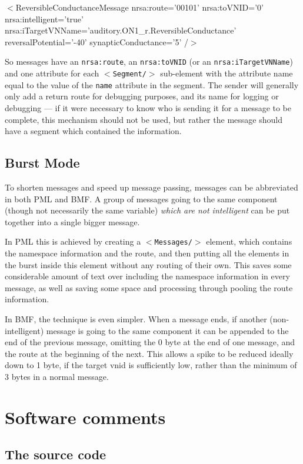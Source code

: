 \documentclass[pdftex,a4paper]{article}
\newcommand{\XML}[2][]{{\tt \small $<$#2#1/$>$}}
\newcommand{\XMLfont}[1]{{\tt \small #1}}
\newcommand{\XMLtext}[1]{
  \begin{tt}
    \begin{small}
      \begin{list}{}{
          \setlength{\topsep}{0pt}
          \setlength{\partopsep}{0pt}
          \setlength{\itemsep}{0pt}
          \setlength{\parsep}{0pt}
          \setlength{\leftmargin}{2em}
          \setlength{\rightmargin}{2em}
          \setlength{\labelsep}{0pt}
        }
      \item #1
      \end{list}
    \end{small}
  \end{tt}
}
\newcommand{\XMLsimple}[2][]{\XMLtext{$<$#2#1/$>$}}
\begin{document}
\XMLsimple[ nrsa:route='00101' nrsa:toVNID='0' nrsa:intelligent='true'
nrsa:iTargetVNName='auditory.ON1\_r.ReversibleConductance'
reversalPotential='-40' synapticConductance='5'
]{ReversibleConductanceMessage}

So messages have an \XMLfont{nrsa:route}, an \XMLfont{nrsa:toVNID} (or
an \XMLfont{nrsa:iTargetVNName}) and one attribute for each
\XML{Segment} sub-element with the attribute name equal to the value
of the \XMLfont{name} attribute in the segment. The sender will
generally only add a return route for debugging purposes, and its name
for logging or debugging --- if it were necessary to know who is
sending it for a message to be complete, this mechanism should not be
used, but rather the message should have a segment which contained the
information.

\subsection{Burst Mode}

To shorten messages and speed up message passing, messages can be
abbreviated in both PML and BMF. A group of messages going to the same
component (though not necessarily the same variable) {\em which are
not intelligent} can be put together into a single bigger message.

In PML this is achieved by creating a \XML{Messages} element, which
contains the namespace information and the route, and then putting all
the elements in the burst inside this element without any routing of
their own. This saves some considerable amount of text over including
the namespace information in every message, as well as saving some
space and processing through pooling the route information.

In BMF, the technique is even simpler. When a message ends, if another
(non-intelligent) message is going to the same component it can be
appended to the end of the previous message, omitting the 0 byte at
the end of one message, and the route at the beginning of the
next. This allows a spike to be reduced ideally down to 1 byte, if the
target vnid is sufficiently low, rather than the minimum of 3 bytes in
a normal message.

\section{Software comments}

\subsection{The source code}
\end{document}
